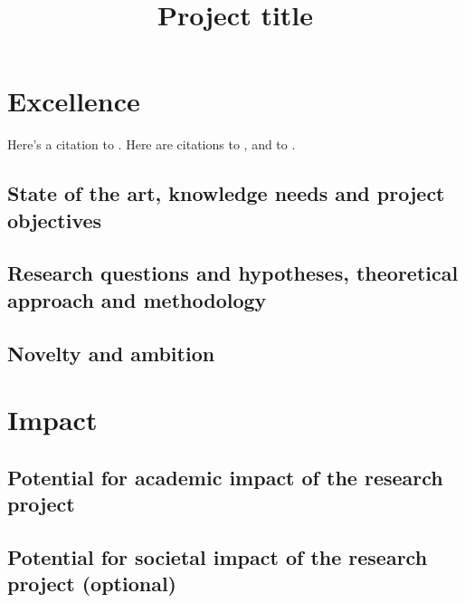 \documentclass{nfr}
\title{Project title}
\begin{document}

% 
% 
% 
% 


\maketitle

\section{Excellence}

Here's a citation to \cite{texbook}. Here are citations to \cite{texbook,knuth:1984,lesk:1977}, and to \cite{lesk:1977,texbook,latex2e,latex:companion}.

\subsection{State of the art, knowledge needs and project objectives}

\subsection{Research questions and hypotheses, theoretical approach and methodology}

\subsection{Novelty and ambition}

\section{Impact}

\subsection{Potential for academic impact of the research project}

\subsection{Potential for societal impact of the research project (optional)}
\end{document}
